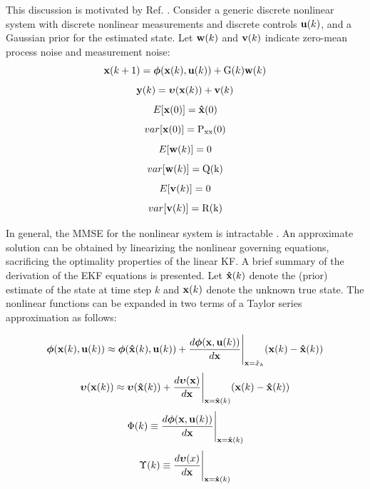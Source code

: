This discussion is motivated by Ref. \cite{crassidis2011}.
Consider a generic discrete nonlinear system with discrete nonlinear measurements and discrete controls $\mathrm{\mathbf{u}}(k)$, and a Gaussian prior for the estimated state.
Let $\mathrm{\mathbf{w}}(k)$ and $\mathrm{\mathbf{v}}(k)$ indicate zero-mean process noise and measurement noise:
\begin{equation}
\mathrm{\mathbf{x}}(k+1) = {\mathrm{\boldsymbol{\phi}}}(\mathrm{\mathbf{x}}(k),\mathrm{\mathbf{u}}(k)) + {\mathrm{G}}(k) \mathrm{\mathbf{w}}(k)
\end{equation}
\begin{equation} \mathrm{\mathbf{y}}(k) = {\mathrm{\boldsymbol{\upsilon}}}(\mathrm{\mathbf{x}}(k)) + \mathrm{\mathbf{v}}(k) \end{equation}
\begin{equation} E[\mathrm{\mathbf{x}}(0)] = \mathrm{\mathbf{\hat{x}}}(0) \end{equation}
\begin{equation} var[\mathrm{\mathbf{x}}(0)] = {\mathrm{P_{xx}}}(0) \end{equation}
\begin{equation} E[\mathrm{\mathbf{w}}(k)] = 0\end{equation}
\begin{equation} var[\mathrm{\mathbf{w}}(k)] = \mathrm{Q(k)}\end{equation}
\begin{equation} E[\mathrm{\mathbf{v}}(k)] = 0\end{equation}
\begin{equation} var[\mathrm{\mathbf{v}}(k)] = \mathrm{R(k)}\end{equation}

In general, the MMSE for the nonlinear system is intractable \cite{kay1993}.
An approximate solution can be obtained by linearizing the nonlinear governing equations, sacrificing the optimality properties of the linear KF.
A brief summary of the derivation of the EKF equations is presented.
Let $\mathrm{\mathbf{\hat{x}}}(k)$ denote the (prior) estimate of the state at time step $k$ and $\mathrm{\mathbf{x}}(k)$ denote the unknown true state.
The nonlinear functions can be expanded in two terms of a Taylor series approximation as follows:

\begin{equation}
{\ensuremath{\mathrm{\boldsymbol{\phi}}}}(\mathrm{\mathbf{x}}(k),\mathrm{\mathbf{u}}(k)) \approx {\ensuremath{\mathrm{\boldsymbol{\phi}}}}(\mathrm{\mathbf{\hat{x}}}(k),\mathrm{\mathbf{u}}(k)) + \frac{d{\mathrm{\boldsymbol{\phi}}}(\mathrm{\mathbf{x}},\mathrm{\mathbf{u}}(k))}{d\mathrm{\mathbf{x}}} \Bigg |_{\mathrm{\mathbf{x}}=\hat{x}_k} (\mathrm{\mathbf{x}}(k)-\mathrm{\mathbf{\hat{x}}}(k)) \end{equation}
\begin{equation}
{\ensuremath{\mathrm{\boldsymbol{\upsilon}}}}(\mathrm{\mathbf{x}}(k)) \approx {\ensuremath{\mathrm{\boldsymbol{\upsilon}}}}(\mathrm{\mathbf{\hat{x}}}(k)) + \frac{d{\mathrm{\boldsymbol{\upsilon}}}(\mathrm{\mathbf{x}})}{d\mathrm{\mathbf{x}}} \Bigg |_{\mathrm{\mathbf{x}}=\mathrm{\mathbf{\hat{x}}}(k)} (\mathrm{\mathbf{x}}(k)-\mathrm{\mathbf{\hat{x}}}(k)) \end{equation}
\begin{equation}
{\ensuremath{\mathrm{\Phi}}}(k) \equiv \frac{d{\mathrm{\boldsymbol{\phi}}}(\mathrm{\mathbf{x}},\mathrm{\mathbf{u}}(k))}{d\mathrm{\mathbf{x}}} \Bigg |_{\mathrm{\mathbf{x}}=\mathrm{\mathbf{\hat{x}}}(k)} \end{equation}
\begin{equation}
{\ensuremath{\mathrm{\Upsilon}}}(k) \equiv \frac{d{\mathrm{\boldsymbol{\upsilon}}}(x)}{d\mathrm{\mathbf{x}}} \Bigg |_{\mathrm{\mathbf{x}}=\mathrm{\mathbf{\hat{x}}}(k)}
\end{equation}

